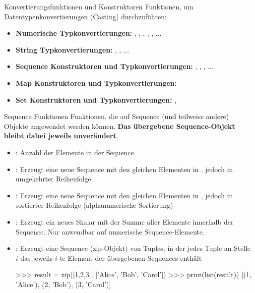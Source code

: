     \begin{frame}[fragile]{Konvertierungsfunktionen und Konstruktoren}
        Funktionen, um Datentypenkonvertierungen (Casting) durchzuführen:
        
        \begin{itemize}
            \item \textbf{Numerische Typkonvertierungen:} , , , , , ...
            
            \item \textbf{String Typkonvertierungen:} , , ...
            
            \item \textbf{Sequence Konstruktoren und Typkonvertierungen:} , , , ...
            
            \item \textbf{Map Konstruktoren und Typkonvertierungen:} 
            
            \item \textbf{Set Konstruktoren und Typkonvertierungen:} , 
        \end{itemize}
    \end{frame}
    
    \begin{frame}[fragile]{Sequence Funktionen}
        Funktionen, die auf Sequence (und teilweise andere) Objekte angewendet werden können. \textbf{Das übergebene Sequence-Objekt  bleibt dabei jeweils unverändert}.
        
        \begin{itemize}
            \item {}: Anzahl der Elemente in der Sequence 
            
            \item {}: Erzeugt eine neue Sequence mit den gleichen Elementen in , jedoch in umgekehrter Reihenfolge
            
            \item {}: Erzeugt eine neue Sequence mit den gleichen Elementen in , jedoch in sortierter Reihenfolge (alphanumerische Sortierung)
            
            \item {}: Erzeugt ein neues Skalar mit der Summe aller Elemente innerhalb der Sequence. Nur anwendbar auf numerische Sequence-Elemente.
            
            \item {}: Erzeugt eine Sequence (zip-Objekt) von Tuples, in der jedes Tuple an Stelle $i$ das jeweils $i$-te Element der übergebenen Sequences enthält
            
\begin{pyconcode}
>>> result = zip([1,2,3], ['Alice', 'Bob', 'Carol'])
>>> print(list(result))
[(1, 'Alice'), (2, 'Bob'), (3, 'Carol')]
\end{pyconcode}            
        \end{itemize}
    \end{frame}
    
